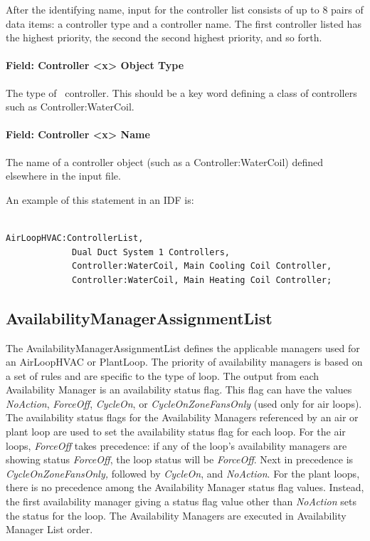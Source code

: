 After the identifying name, input for the controller list consists of up to 8 pairs of data items: a controller type and a controller name. The first controller listed has the highest priority, the second the second highest priority, and so forth.

\paragraph{Field: Controller \textless{}x\textgreater{} Object Type}\label{field-controller-x-object-type}

The type of~ controller. This should be a key word defining a class of controllers such as Controller:WaterCoil.

\paragraph{Field: Controller \textless{}x\textgreater{} Name}\label{field-controller-x-name}

The name of a controller object (such as a Controller:WaterCoil) defined elsewhere in the input file.

An example of this statement in an IDF is:

\begin{lstlisting}

AirLoopHVAC:ControllerList,
             Dual Duct System 1 Controllers,
             Controller:WaterCoil, Main Cooling Coil Controller,
             Controller:WaterCoil, Main Heating Coil Controller;
\end{lstlisting}

\subsection{AvailabilityManagerAssignmentList}\label{availabilitymanagerassignmentlist}

The AvailabilityManagerAssignmentList defines the applicable managers used for an AirLoopHVAC or PlantLoop. The priority of availability managers is based on a set of rules and are specific to the type of loop. The output from each Availability Manager is an availability status flag. This flag can have the values \emph{NoAction}, \emph{ForceOff}, \emph{CycleOn}, or \emph{CycleOnZoneFansOnly} (used only for air loops). The availability status flags for the Availability Managers referenced by an air or plant loop are used to set the availability status flag for each loop. For the air loops, \emph{ForceOff} takes precedence: if any of the loop's availability managers are showing status \emph{ForceOff}, the loop status will be \emph{ForceOff}. Next in precedence is \emph{CycleOnZoneFansOnly,} followed by \emph{CycleOn}, and \emph{NoAction}. For the plant loops, there is no precedence among the Availability Manager status flag values. Instead, the first availability manager giving a status flag value other than \emph{NoAction} sets the status for the loop. The Availability Managers are executed in Availability Manager List order.


